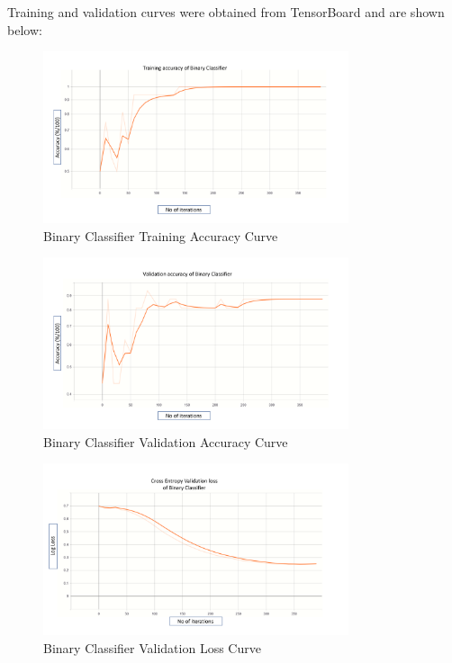 \documentclass[a4paper]{article}
\begin{document}
    Training and validation curves were obtained from TensorBoard and are shown below:
    \begin{figure}[h!]
        \centerline{\includegraphics[width=0.8\textwidth]{../img/results/binTraining.pdf}}
        \label{figX: Binary Training Accuracy Curve} 
        \caption{Binary Classifier Training Accuracy Curve}
    \end{figure}
    \begin{figure}[h!]
        \centerline{\includegraphics[width=0.8\textwidth]{../img/results/binValidationAcc.pdf}}
        \label{figX: Binary Classifier Validation Accuracy Curve} 
        \caption{Binary Classifier Validation Accuracy Curve}
    \end{figure}
    \begin{figure}[h!]
        \centerline{\includegraphics[width=0.8\textwidth]{../img/results/binValidationLoss.pdf}}
        \label{figX: Binary Classifier Validation Loss Curve} 
        \caption{Binary Classifier Validation Loss Curve}
    \end{figure}
\end{document}
